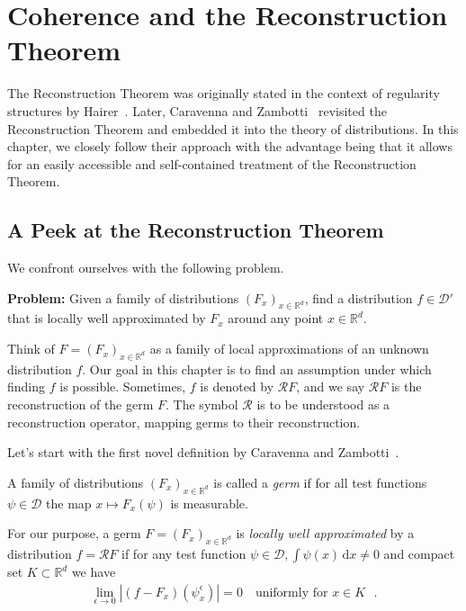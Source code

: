 \chapter{Coherence and the Reconstruction Theorem}\label{chapter:reconstruction}

The Reconstruction Theorem was originally stated in the context of regularity structures by Hairer~\cite{hairer2014theory}. Later, Caravenna and Zambotti~\cite{caravenna2021hairer} revisited the Reconstruction Theorem and embedded it into the theory of distributions. In this chapter, we closely follow their approach with the advantage being that it allows for an easily accessible and self-contained treatment of the Reconstruction Theorem.

\section{A Peek at the Reconstruction Theorem}\label{chapter:first-peek-at-reconstruction}

We confront ourselves with the following problem.

\textbf{Problem:} Given a family of distributions \({(F_x)}_{x \in \mathbb{R}^d}\), find a distribution \(f \in \mathcal{D'}\) that is locally well approximated by \(F_x\) around any point \(x \in \mathbb{R}^d\).

\vspace{0.2cm}

Think of \({ F= (F_x)}_{x \in \mathbb{R}^d}\) as a family of local approximations of an unknown distribution \(f\). Our goal in this chapter is to find an assumption under which finding \(f\) is possible. Sometimes, \( f \) is denoted by \( \mathcal{R}F \), and we say \( \mathcal{R}F \) is the reconstruction of the germ \( F \). The symbol \( \mathcal{R} \) is to be understood as a reconstruction operator, mapping germs to their reconstruction.

Let's start with the first novel definition by Caravenna and Zambotti~\cite{caravenna2021hairer}.
\begin{definition}[Germ]
    A family of distributions \({(F_x)}_{x \in \mathbb{R}^d}\) is called a \emph{germ} if for all test functions \(\psi \in \mathcal{D}\) the map \(x \mapsto F_x(\psi)\) is measurable.
\end{definition}

For our purpose, a germ \({F = (F_x)}_{x \in \mathbb{R}^d}\) is \emph{locally well approximated} by a distribution \( f = \mathcal{R}F \) if for any test function \(\psi \in \mathcal{D}, \int \psi(x)\, \mathrm{d}x \neq 0\) and compact set \(K \subset \mathbb{R}^d\) we have 
\begin{align}\label{peek:well-approximated}
    \lim_{\epsilon \to 0} |(f - F_x)(\psi^\epsilon_x)| = 0 \quad \text{uniformly for \(x \in K\) }.
\end{align} 

